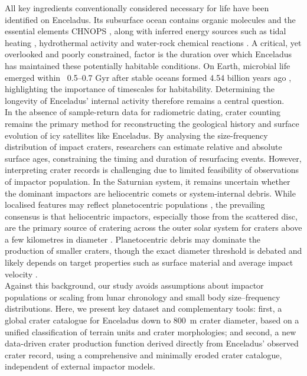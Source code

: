\documentclass[preprint,11pt,3p,times,authoryear]{elsarticle}
\begin{document}
All key ingredients conventionally considered necessary for life have been identified on Enceladus. Its subsurface ocean contains organic molecules \citep{Peter2024} and the essential elements CHNOPS \citep{Hsu2015,Sekine2015,Bouquet2015,Choblet2017,Nimmo2018}, along with inferred energy sources such as tidal heating \citep{Thomas2016,Nimmo2023}, hydrothermal activity and water-rock chemical reactions \citep{Waite2017,Deamer2017,Choblet2017}. A critical, yet overlooked and poorly constrained, factor is the duration over which Enceladus has maintained these potentially habitable conditions. On Earth, microbial life emerged within ~0.5–0.7 Gyr after stable oceans formed 4.54 billion years ago \citep{Wilde2001,Nutman2016,Bell2015}, highlighting the importance of timescales for habitability. Determining the longevity of Enceladus’ internal activity therefore remains a central question.\\

In the absence of sample-return data for radiometric dating, crater counting remains the primary method for reconstructing the geological history and surface evolution of icy satellites like Enceladus. By analysing the size-frequency distribution of impact craters, researchers can estimate relative and absolute surface ages, constraining the timing and duration of resurfacing events. However, interpreting crater records is challenging due to limited feasibility of observations of impactor population.
In the Saturnian system, it remains uncertain whether the dominant impactors are heliocentric comets or system-internal debris. While localised features may reflect planetocentric populations \citep[e.g.][]{Cuk2016,Ferguson2022}, the prevailing consensus is that heliocentric impactors, especially those from the scattered disc, are the primary source of cratering across the outer solar system for craters above a few kilometres in diameter \citep{Shoemaker1982,Chapman1986,Zahnle1998,Hirata2016,Nesvorny2019,Wong2023,Nesvorny2023}. Planetocentric debris may dominate the production of smaller craters, though the exact diameter threshold is debated and likely depends on target properties such as surface material and average impact velocity \citep{Hirata2016,Bell2020}.\\

Against this background, our study avoids assumptions about impactor populations or scaling from lunar chronology and small body size–frequency distributions. Here, we present key dataset and complementary tools: first, a global crater catalogue for Enceladus down to 800~m crater diameter, based on a unified classification of terrain units and crater morphologies; and second, a new data-driven crater production function derived directly from Enceladus’ observed crater record, using a comprehensive and minimally eroded crater catalogue, independent of external impactor models. \\
\end{document}
